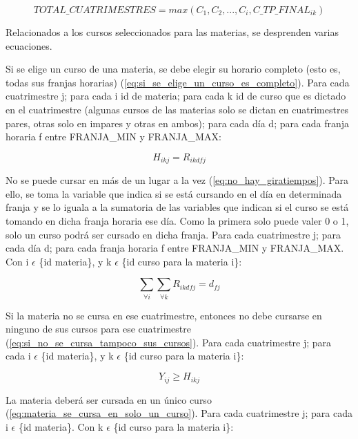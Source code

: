 \documentclass[a4paper]{article}
\begin{document}
\begin{equation}\label{eq:total_cuatrimestres}
TOTAL\_CUATRIMESTRES = max(C_1, C_2, ..., C_i, C\_TP\_FINAL_{ik})
\end{equation}

Relacionados a los cursos seleccionados para las materias, se desprenden varias ecuaciones.

Si se elige un curso de una materia, se debe elegir su horario completo (esto es, todas sus franjas horarias) (\ref{eq:si_se_elige_un_curso_es_completo}). Para cada cuatrimestre j; para cada i id de materia; para cada k id de curso que es dictado en el cuatrimestre (algunas cursos de las materias solo se dictan en cuatrimestres pares, otras solo en impares y otras en ambos); para cada día d; para cada franja horaria f entre FRANJA\_MIN y FRANJA\_MAX:

\begin{equation}\label{eq:si_se_elige_un_curso_es_completo}
H_{ikj} = R_{ikdfj}
\end{equation}

No se puede cursar en más de un lugar a la vez (\ref{eq:no_hay_giratiempos}). Para ello, se toma la variable que indica si se está cursando en el día en determinada franja y se lo iguala a la sumatoria de las variables que indican si el curso se está tomando en dicha franja horaria ese día. Como la primera solo puede valer 0 o 1, solo un curso podrá ser cursado en dicha franja. Para cada cuatrimestre j; para cada día d; para cada franja horaria f entre FRANJA\_MIN y FRANJA\_MAX. Con i $\epsilon$ \{id materia\}, y k $\epsilon$ \{id curso para la materia i\}:

\begin{equation}\label{eq:no_hay_giratiempos}
\sum_{\forall i} \sum_{\forall k} R_{ikdfj} = d_{fj}
\end{equation}

Si la materia no se cursa en ese cuatrimestre, entonces no debe cursarse en ninguno de sus cursos para ese cuatrimestre (\ref{eq:si_no_se_cursa_tampoco_sus_cursos}). Para cada cuatrimestre j; para cada i $\epsilon$ \{id materia\}, y k $\epsilon$ \{id curso para la materia i\}:

\begin{equation}\label{eq:si_no_se_cursa_tampoco_sus_cursos}
Y_{ij} \geq H_{ikj}
\end{equation}

La materia deberá ser cursada en un único curso (\ref{eq:materia_se_cursa_en_solo_un_curso}). Para cada cuatrimestre j; para cada i $\epsilon$ \{id materia\}. Con k $\epsilon$ \{id curso para la materia i\}:
\end{document}
